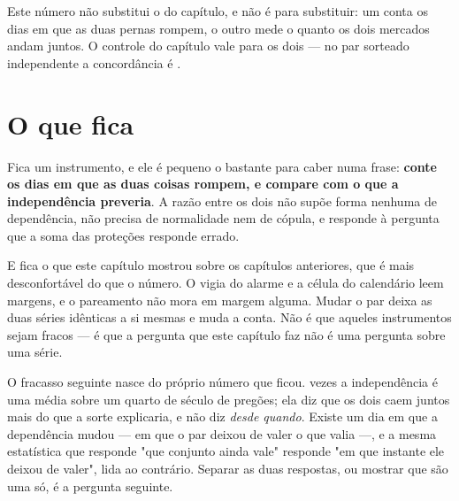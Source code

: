Este número não substitui o do capítulo, e não é para substituir: um conta os dias em que as duas
pernas rompem, o outro mede o quanto os dois mercados andam juntos. O controle do capítulo vale para
os dois --- no par sorteado independente a concordância é \numParesControleTau{}.

\section{O que fica}

Fica um instrumento, e ele é pequeno o bastante para caber numa frase: \textbf{conte os dias em
que as duas coisas rompem, e compare com o que a independência preveria}. A razão entre os dois
não supõe forma nenhuma de dependência, não precisa de normalidade nem de cópula, e responde à
pergunta que a soma das proteções responde errado.

E fica o que este capítulo mostrou sobre os capítulos anteriores, que é mais desconfortável do
que o número. O vigia do alarme e a célula do calendário leem margens, e o pareamento não mora em margem alguma. Mudar o par deixa as duas séries idênticas a si mesmas e muda a conta. Não é que aqueles instrumentos sejam fracos --- é que a pergunta que este capítulo faz não
é uma pergunta sobre uma série.

O fracasso seguinte nasce do próprio número que ficou. \numDependenciaExcesso{} vezes a
independência é uma média sobre um quarto de século de pregões; ela diz que os dois caem juntos mais do que a
sorte explicaria, e não diz \emph{desde quando}. Existe um dia em que a dependência mudou --- em
que o par deixou de valer o que valia ---, e a mesma estatística que responde "que conjunto ainda
vale" responde "em que instante ele deixou de valer", lida ao contrário. Separar as duas
respostas, ou mostrar que são uma só, é a pergunta seguinte.
